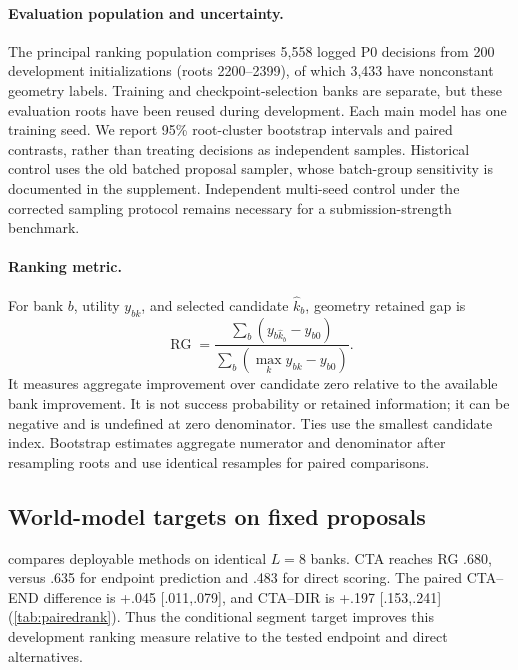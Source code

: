 \paragraph{Evaluation population and uncertainty.}
The principal ranking population comprises 5,558 logged P0 decisions from 200 development initializations (roots 2200--2399), of which 3,433 have nonconstant geometry labels. Training and checkpoint-selection banks are separate, but these evaluation roots have been reused during development. Each main model has one training seed. We report 95\% root-cluster bootstrap intervals and paired contrasts, rather than treating decisions as independent samples. Historical control uses the old batched proposal sampler, whose batch-group sensitivity is documented in the supplement. Independent multi-seed control under the corrected sampling protocol remains necessary for a submission-strength benchmark.

\paragraph{Ranking metric.}
For bank $b$, utility $y_{bk}$, and selected candidate $\hat k_b$, geometry retained gap is
\begin{equation}
\operatorname{RG}=\frac{\sum_b(y_{b\hat k_b}-y_{b0})}
{\sum_b(\max_k y_{bk}-y_{b0})}.
\label{eq:rg}
\end{equation}
It measures aggregate improvement over candidate zero relative to the available bank improvement. It is not success probability or retained information; it can be negative and is undefined at zero denominator. Ties use the smallest candidate index. Bootstrap estimates aggregate numerator and denominator after resampling roots and use identical resamples for paired comparisons.

\subsection{World-model targets on fixed proposals}
\label{sec:ranking}
 compares deployable methods on identical $L=8$ banks. CTA reaches RG .680, versus .635 for endpoint prediction and .483 for direct scoring. The paired CTA--END difference is +.045 [.011,.079], and CTA--DIR is +.197 [.153,.241] (\cref{tab:pairedrank}). Thus the conditional segment target improves this development ranking measure relative to the tested endpoint and direct alternatives.

